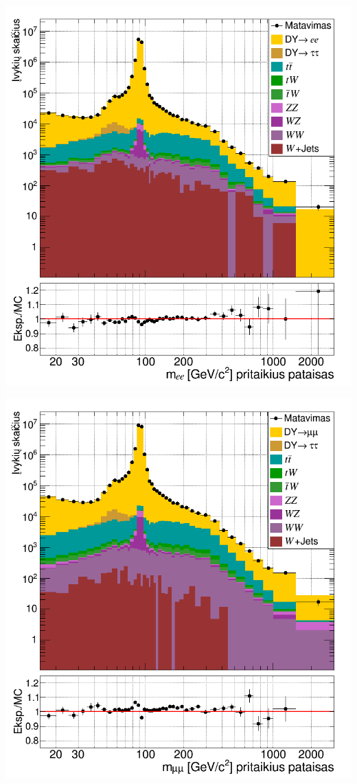 \documentclass[a4paper, 12pt]{article}
\begin{document}
\vspace{0.5cm}
\begin{minipage}[t]{0.48\textwidth}
	\includegraphics[width=\linewidth]{ee_mass_after.png}
\end{minipage}
\hfill
\begin{minipage}[t]{0.48\textwidth}
	\includegraphics[width=\linewidth]{mumu_mass_after.png}
\end{minipage}
\end{document}
